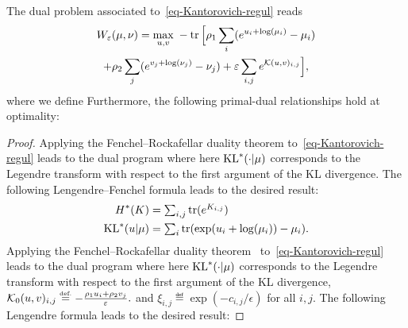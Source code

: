 \begin{prop}
	The dual problem associated to~\eqref{eq-Kantorovich-regul} reads
	\begin{multline}\label{eq-dual-pb}
		W_\varepsilon(\mu,\nu)
		= 
		\underset{u,v}{\max}\; - 
				\operatorname{tr}\Big[
						\rho_1 \sum_i (e^{u_i+\log(\mu_i)} - \mu_i) \\
					+   \rho_2 \sum_j (e^{v_j+\log(\nu_j)} - \nu_j)
					+    \varepsilon \sum_{i,j}  e^{ \mathcal{K}(u,v)_{i,j} }
			 \Big], 
	\end{multline}	
	where we define
	Furthermore, the following primal-dual relationships hold at optimality:
\end{prop}
\begin{proof} 
Applying the Fenchel--Rockafellar duality theorem  to~\eqref{eq-Kantorovich-regul} leads to the dual program
where here $\operatorname{KL}^*(\cdot|\mu)$ corresponds to the Legendre transform with respect to the first argument of the KL divergence.
%
The following Lengendre--Fenchel  formula leads to the desired result:
\begin{align*} %
	H^*(K) &= \textstyle\sum_{i,j} \tr( e^{K_{i,j}} ) \\
	\KL^*(u|\mu) &= \textstyle\sum_i \tr( \exp(u_i+\log(\mu_i)) - \mu_i).
\end{align*}
%
\fi
Applying the Fenchel--Rockafellar duality theorem~\cite{rockafellar-convex} to~\eqref{eq-Kantorovich-regul} leads to the dual program
where here $\operatorname{KL}^*(\cdot|\mu)$ corresponds to the Legendre transform with respect to the first argument of the KL divergence, $ \Kern_0(u,v)_{i,j} \eqdef -\frac{\rho_1 u_i + \rho_2 v_j}{\epsilon}.$ and $\xi_{i,j} \eqdef \exp(-c_{i,j}/\epsilon)$ for all $i,j$.
%
The following Lengendre formula leads to the desired result:
\end{proof}




